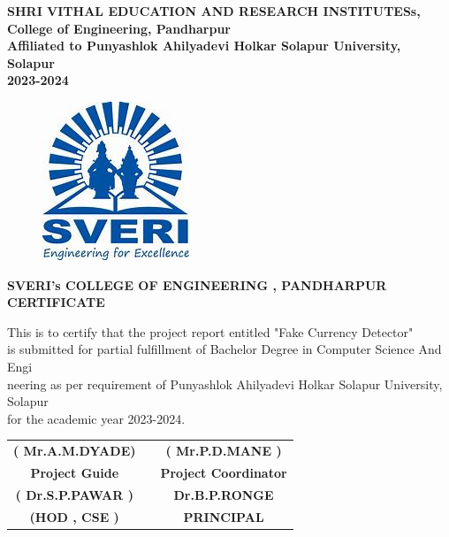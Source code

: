 \documentclass[12pt]{article}
\begin{document}
\begin{center}
\textbf{SHRI VITHAL EDUCATION AND RESEARCH INSTITUTESs,\\[2mm]
College of Engineering, Pandharpur\\[3mm]
Affiliated to Punyashlok Ahilyadevi Holkar Solapur University, Solapur\\[2mm]
2023-2024}
\end{center}  
 
\clearpage


\begin{figure}[h]
 \centering
 \includegraphics[scale=1]{sveri2logo}
\end{figure}

\begin{center}
 \large \textbf { SVERI's COLLEGE OF ENGINEERING , PANDHARPUR }\\[7mm]
 \textbf{CERTIFICATE}\\[7mm]
 \end{center} 
 This is to certify that the project report entitled "Fake Currency Detector"\\[2mm] is submitted for partial fulfillment of Bachelor Degree in Computer Science And Engi\\[2mm]neering as per requirement of Punyashlok Ahilyadevi Holkar Solapur University, Solapur\\[2mm] for the academic year 2023-2024.\\[30mm] 
 

 
 \begin{tabular}{ c c c } 
 \textbf{( Mr.A.M.DYADE)} & \hspace{2.0in} & \textbf{( Mr.P.D.MANE )} \\ [1mm] 
 \textbf {Project Guide} & \hspace{2.0in} & \textbf{Project Coordinator}\\[30mm]
 \textbf{( Dr.S.P.PAWAR )} & \hspace{2.0in}  & \textbf{Dr.B.P.RONGE}\\[1mm]
 \textbf{(HOD , CSE )} & \hspace{2.0in}  & \textbf{ PRINCIPAL }\\[30mm]
 \end{tabular}
 
\end{document}
